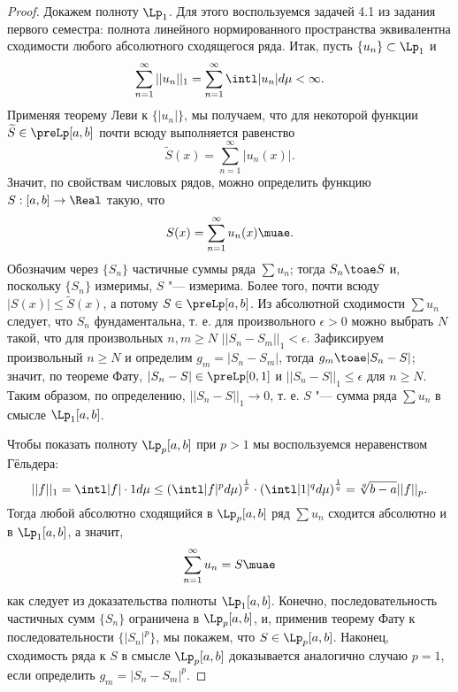 \documentclass[main]{subfiles}
\begin{document}
\begin{proof}
  Докажем полноту \( \Lp_1 \).
  Для этого воспользуемся задачей 4.1
  из задания первого семестра:
  полнота линейного нормированного пространства
  эквивалентна сходимости любого абсолютного сходящегося ряда.
  Итак, пусть \( \{ u_n \} \subset \Lp_1 \) и
  \[
    \sum_{n=1}^\infty ||u_n||_1 =
    \sum_{n=1}^\infty \intl |u_n| d\mu < \infty.
  \]
  Применяя теорему Леви
  к \( \{ |u_n| \} \),
  мы получаем,
  что для некоторой функции
  \( \widetilde{S} \in \preLp[a, b] \)
  почти всюду выполняется равенство
  \[
    \widetilde{S}(x) = \sum_{n=1}^\infty |u_n(x)|.
  \]
  Значит, по свойствам числовых рядов,
  можно определить функцию \( S : [a, b] \to \Real \)
  такую, что
  \[
    S(x) = \sum_{n=1}^\infty u_n(x) \muae.
  \]
  Обозначим через \( \{ S_n \} \)
  частичные суммы ряда \( \sum u_n \);
  тогда \( S_n \toae S \) и,
  поскольку \( \{ S_n \} \) измеримы,
  \( S \) "--- измерима.
  Более того, почти всюду \( |S(x)| \le \widetilde{S}(x) \),
  а потому \( S \in \preLp[a, b] \).
  Из абсолютной сходимости \( \sum u_n \)
  следует, что \( S_n \) фундаментальна,
  т. е. для произвольного \( \epsilon > 0 \)
  можно выбрать \( N \) такой,
  что для произвольных \( n, m \ge N \)
  \( ||S_n - S_m||_1 < \epsilon \).
  Зафиксируем произвольный \( n \ge N \)
  и определим \( g_m = |S_n - S_m| \),
  тогда \( g_m \toae |S_n - S| \);
  значит, по теореме Фату,
  \( |S_n - S| \in \preLp[0, 1] \)
  и \( ||S_n - S||_1 \le \epsilon \) для \( n \ge N \).
  Таким образом, по определению, \( ||S_n - S||_1 \to 0 \),
  т. е. \( S \) "--- сумма ряда \( \sum u_n \)
  в смысле \( \Lp_1[a, b] \).

  Чтобы показать полноту \( \Lp_p[a, b] \)
  при \( p > 1 \) мы воспользуемся неравенством
  Гёльдера:
  \[
    ||f||_1 = \intl |f| \cdot 1 d\mu \le
    \left( \intl |f|^p d\mu  \right)^{\frac1p} \cdot
    \left( \intl |1|^q d\mu \right)^\frac1q =
    \sqrt[q]{b - a} ||f||_p.
  \]
  Тогда любой абсолютно сходящийся в \( \Lp_p[a, b] \)
  ряд \( \sum u_n \)
  сходится абсолютно и в \( \Lp_1[a, b] \),
  а значит,
  \[
    \sum_{n=1}^\infty u_n = S \muae
  \]
  как следует из доказательства полноты \( \Lp_1[a, b] \).
  Конечно, последовательность частичных сумм
  \( \{ S_n \} \) ограничена в \( \Lp_p[a, b] \),
  и, применив теорему Фату к последовательности
  \( \{ |S_n|^p \} \), мы покажем,
  что \( S \in \Lp_p[a, b] \).
  Наконец, сходимость ряда к \( S \)
  в смысле \( \Lp_p[a, b] \) доказывается
  аналогично случаю \( p = 1 \),
  если определить \( g_m = |S_n - S_m|^p \).


\end{proof}
\end{document}
